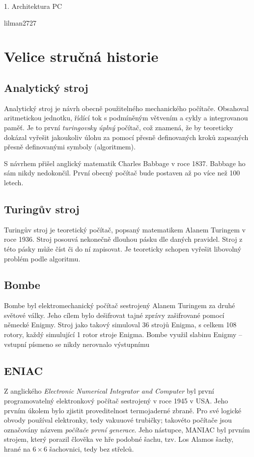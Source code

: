 \documentclass[a4paper]{article}
\begin{document}
\thispagestyle{empty}
\begin{center}
    \vspace*{5cm}
    {\huge{1. Architektura PC}} \par
    \vspace{15cm}
    {\large{lilman2727}}
\end{center}


\newpage
\thispagestyle{empty}
\tableofcontents
\newpage

\section{Velice stručná historie}
    \subsection{Analytický stroj}
        Analytický stroj je návrh obecně použitelného mechanického počítače. Obsahoval aritmetickou jednotku, řídící tok s podmíněným větvením a cykly a integrovanou paměť. Je to první \textit{turingovsky úplný} počítač, což znamená, že by teoreticky dokázal vyřešit jakoukoliv úlohu za pomocí přesně definovaných kroků zapsaných přesně definovanými symboly (algoritmem).\par
        S návrhem přišel anglický matematik Charles Babbage v roce 1837. Babbage ho sám nikdy nedokončil. První obecný počítač bude postaven až po více než 100 letech.

    \subsection{Turingův stroj}
        Turingův stroj je teoretický počítač, popsaný matematikem Alanem Turingem v roce 1936. Stroj posouvá nekonečně dlouhou pásku dle daných pravidel. Stroj z této pásky může číst či do ní zapisovat. Je teoreticky schopen vyřešit libovolný problém podle algoritmu.
    \subsection{Bombe}
        Bombe byl elektromechanický počítač sestrojený Alanem Turingem za druhé světové války. Jeho cílem bylo dešifrovat tajné zprávy zašifrované pomocí německé Enigmy. Stroj jako takový simuloval 36 strojů Enigma, s celkem 108 rotory, každý simulující 1 rotor stroje Enigma. Bombe využil slabinu Enigmy -- vstupní písmeno se nikdy nerovnalo výstupnímu 
    \subsection{ENIAC}
        Z anglického \textit{Electronic Numerical Integrator and Computer} byl první programovatelný elektronkový počítač sestrojený v roce 1945 v USA. Jeho prvním úkolem bylo zjistit proveditelnost termojaderné zbraně. Pro své logické obvody používal elektronky, tedy vakuuové trubičky; takovéto počítače jsou označovány názvem \textit{počítače první generace}. Jeho nástupce, MANIAC byl prvním strojem, který porazil člověka ve hře podobné šachu, tzv. Los Alamos šachy, hrané na $6 \times 6$ šachovnici, tedy bez střelců.
\end{document}
